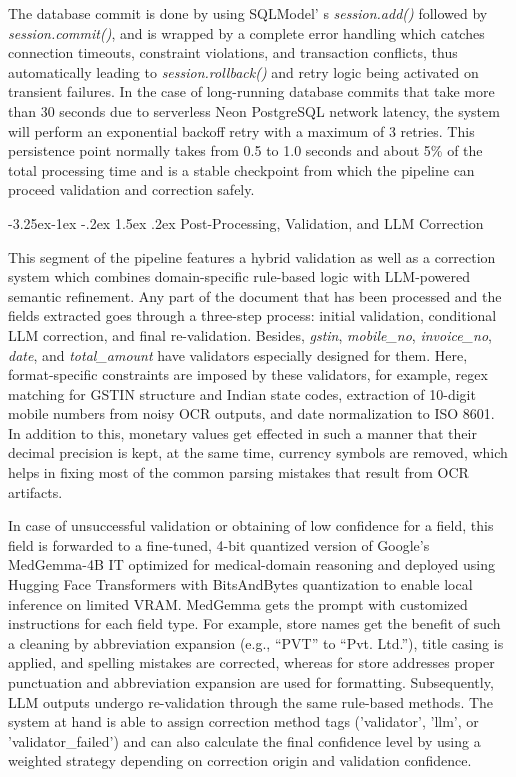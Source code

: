 \documentclass[conference,twocolumn]{IEEEtran}
\makeatletter
\renewcommand{\subsection}{\@startsection{subsection}{2}{\z@}%
  {-3.25ex\@plus -1ex \@minus -.2ex}%
  {1.5ex \@plus .2ex}%
  {\normalfont\normalsize\bfseries\itshape}}
\makeatother
\begin{document}
The database commit is done by using SQLModel' s
\textit{session.add()} followed by \textit{session.commit()}, and is wrapped
by a complete error handling which catches connection timeouts,
constraint violations, and transaction conflicts, thus automatically
leading to \textit{session.rollback()} and retry logic being activated on
transient failures. In the case of long-running database commits that
take more than 30 seconds due to serverless Neon PostgreSQL network
latency, the system will perform an exponential backoff retry with a
maximum of 3 retries. This persistence point normally takes from 0.5 to
1.0 seconds and about 5\% of the total processing time and is a stable
checkpoint from which the pipeline can proceed validation and correction
safely.

\subsection{Post-Processing, Validation, and LLM Correction}

This segment
of the pipeline features a hybrid validation as well as a correction
system which combines domain-specific rule-based logic with LLM-powered
semantic refinement. Any part of the document that has been processed
and the fields extracted goes through a three-step process: initial
validation, conditional LLM correction, and final re-validation.
Besides, \textit{gstin}, \textit{mobile\_no}, \textit{invoice\_no},
\textit{date}, and \textit{total\_amount} have validators especially
designed for them. Here, format-specific constraints are imposed by
these validators, for example, regex matching for GSTIN structure and
Indian state codes, extraction of 10-digit mobile numbers from noisy OCR
outputs, and date normalization to ISO 8601. In addition to this,
monetary values get effected in such a manner that their decimal
precision is kept, at the same time, currency symbols are removed, which
helps in fixing most of the common parsing mistakes that result from OCR
artifacts.

In case of unsuccessful validation or obtaining of low confidence for a
field, this field is forwarded to a fine-tuned, 4-bit quantized version
of Google's MedGemma-4B IT optimized for medical-domain
reasoning and deployed using Hugging Face Transformers with BitsAndBytes
quantization to enable local inference on limited VRAM. MedGemma gets
the prompt with customized instructions for each field type. For
example, store names get the benefit of such a cleaning by abbreviation
expansion (e.g., ``PVT'' to ``Pvt. Ltd.''), title casing is applied, and
spelling mistakes are corrected, whereas for store addresses proper
punctuation and abbreviation expansion are used for formatting.
Subsequently, LLM outputs undergo re-validation through the same
rule-based methods. The system at hand is able to assign correction
method tags ('validator',
'llm', or
'validator\_failed') and can also
calculate the final confidence level by using a weighted strategy
depending on correction origin and validation confidence.
\end{document}
